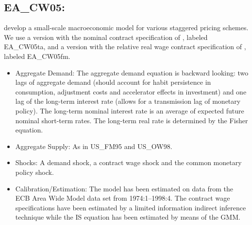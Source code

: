 \documentclass[11pt,a4paper]{article}
\begin{document}
	
	
	\subsection{EA\_CW05: \cite{CoenenWieland2005}}
	\label{EACW05ta}
	\label{EACW05fm}
	\cite{CoenenWieland2005} develop a small-scale macroeconomic model for various staggered pricing schemes. We use a version with the nominal contract specification of \cite{Taylor1980}, labeled EA\_CW05ta, and a version with the relative real wage contract specification of \cite{FuhrerMoore1995}, labeled EA\_CW05fm.
	
	\begin{itemize}
		\item Aggregate Demand: The aggregate demand equation is backward looking: two lags of aggregate demand (should account for habit persistence in consumption, adjustment costs and accelerator effects in investment) and one lag of the long-term interest rate (allows for a transmission lag of monetary policy). The long-term nominal interest rate is an average of expected future nominal short-term rates. The long-term real rate is determined by the Fisher equation.
		\item Aggregate Supply: As in US\_FM95 and US\_OW98.
		\item Shocks: A demand shock, a contract wage shock and the common monetary policy shock.
		\item Calibration/Estimation: The model has been estimated on data from the ECB Area Wide Model data set from 1974:1--1998:4. The contract wage specifications have been estimated by a limited information indirect inference technique while the IS equation has been estimated by means of the GMM.
		

\end{itemize}
\end{document}
